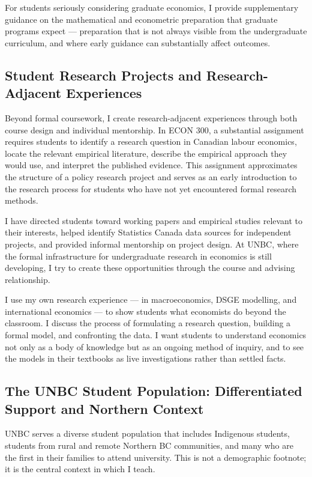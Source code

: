 \documentclass[11pt,letterpaper]{article}
\begin{document}
For students seriously considering graduate economics, I provide supplementary guidance on the mathematical and econometric preparation that graduate programs expect --- preparation that is not always visible from the undergraduate curriculum, and where early guidance can substantially affect outcomes.

\subsection{Student Research Projects and Research-Adjacent Experiences}

Beyond formal coursework, I create research-adjacent experiences through both course design and individual mentorship. In ECON 300, a substantial assignment requires students to identify a research question in Canadian labour economics, locate the relevant empirical literature, describe the empirical approach they would use, and interpret the published evidence. This assignment approximates the structure of a policy research project and serves as an early introduction to the research process for students who have not yet encountered formal research methods.

I have directed students toward working papers and empirical studies relevant to their interests, helped identify Statistics Canada data sources for independent projects, and provided informal mentorship on project design. At UNBC, where the formal infrastructure for undergraduate research in economics is still developing, I try to create these opportunities through the course and advising relationship.

I use my own research experience --- in macroeconomics, DSGE modelling, and international economics --- to show students what economists do beyond the classroom. I discuss the process of formulating a research question, building a formal model, and confronting the data. I want students to understand economics not only as a body of knowledge but as an ongoing method of inquiry, and to see the models in their textbooks as live investigations rather than settled facts.

\subsection{The UNBC Student Population: Differentiated Support and Northern Context}

UNBC serves a diverse student population that includes Indigenous students, students from rural and remote Northern BC communities, and many who are the first in their families to attend university. This is not a demographic footnote; it is the central context in which I teach.
\end{document}
